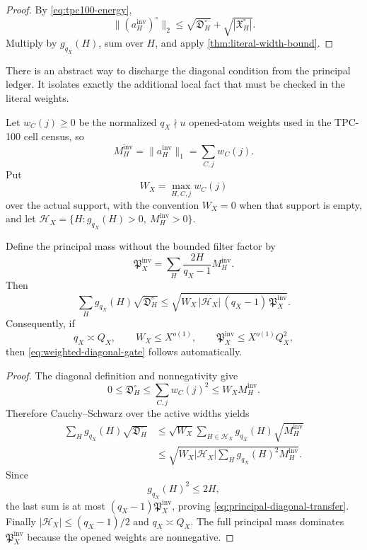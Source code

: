 \begin{proof}
By \eqref{eq:tpc100-energy},
\[
 \|(a_H^{\mathrm{inv}})^\circ\|_2
 \le
 \sqrt{\mathfrak D_H^\circ}
 +
 \sqrt{|\mathfrak X_H^\circ|}.
\]
Multiply by \(g_{q_X}(H)\), sum over \(H\), and apply
\cref{thm:literal-width-bound}.
\end{proof}

There is an abstract way to discharge the diagonal condition from
the principal ledger.  It isolates exactly the additional local
fact that must be checked in the literal weights.

\begin{definition}
\label{def:atom-cap}
Let \(w_C(j)\ge0\) be the normalized \(q_X\nmid u\) opened-atom
weights used in the TPC-100 cell census, so
\[
 M_H^{\mathrm{inv}}
 =
 \|a_H^{\mathrm{inv}}\|_1
 =
 \sum_{C,j}w_C(j).
\]
Put
\[
 W_X=\max_{H,C,j}w_C(j)
\]
over the actual support, with the convention \(W_X=0\) when that
support is empty, and let
\(\mathcal H_X
=\{H:g_{q_X}(H)>0,\ M_H^{\mathrm{inv}}>0\}\).
\end{definition}

\begin{theorem}
\label{thm:principal-diagonal-transfer}
Define the principal mass without the bounded filter factor by
\[
 \mathfrak P_X^{\mathrm{inv}}
 =
 \sum_H\frac{2H}{q_X-1}M_H^{\mathrm{inv}}.
\]
Then
\begin{equation}
 \boxed{
 \sum_Hg_{q_X}(H)\sqrt{\mathfrak D_H^\circ}
 \le
 \sqrt{
 W_X\,|\mathcal H_X|\,(q_X-1)\,
 \mathfrak P_X^{\mathrm{inv}}}.}
\label{eq:principal-diagonal-transfer}
\end{equation}
Consequently, if
\[
 q_X\asymp Q_X,\qquad
 W_X\le X^{o(1)},\qquad
 \mathfrak P_X^{\mathrm{inv}}\le X^{o(1)}Q_X^2,
\]
then \eqref{eq:weighted-diagonal-gate} follows automatically.
\end{theorem}

\begin{proof}
The diagonal definition and nonnegativity give
\[
 0\le\mathfrak D_H^\circ
 \le\sum_{C,j}w_C(j)^2
 \le W_XM_H^{\mathrm{inv}}.
\]
Therefore Cauchy--Schwarz over the active widths yields
\begin{align*}
 \sum_Hg_{q_X}(H)\sqrt{\mathfrak D_H^\circ}
 &\le
 \sqrt{W_X}
 \sum_{H\in\mathcal H_X}
 g_{q_X}(H)\sqrt{M_H^{\mathrm{inv}}}\\
 &\le
 \sqrt{
 W_X|\mathcal H_X|
 \sum_Hg_{q_X}(H)^2M_H^{\mathrm{inv}}}.
\end{align*}
Since
\[
 g_{q_X}(H)^2\le2H,
\]
the last sum is at most
 \((q_X-1)\mathfrak P_X^{\mathrm{inv}}\), proving
\eqref{eq:principal-diagonal-transfer}.  Finally
\(|\mathcal H_X|\le(q_X-1)/2\) and \(q_X\asymp Q_X\).
The full principal mass dominates
\(\mathfrak P_X^{\mathrm{inv}}\) because the opened weights are
nonnegative.
\end{proof}

